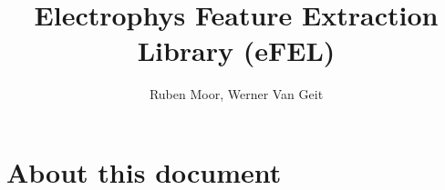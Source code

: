 \documentclass[a4paper]{article}
\title{Electrophys Feature Extraction Library (eFEL)}
\author{Ruben Moor, Werner Van Geit}
\begin{document}
\maketitle
\newpage

\tableofcontents

\section*{About this document}

\end{document}
